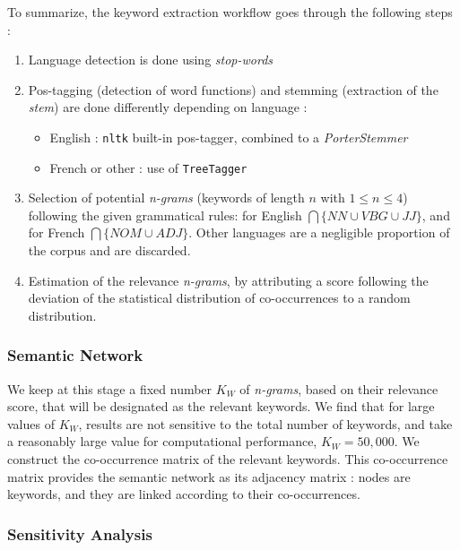 To summarize, the keyword extraction workflow goes through the following steps :

\begin{enumerate}
\item Language detection is done using \textit{stop-words}
\item Pos-tagging (detection of word functions) and stemming (extraction of the \emph{stem}) are done differently depending on language :
\begin{itemize}
\item English : \texttt{nltk} built-in pos-tagger, combined to a \emph{PorterStemmer}
\item French or other : use of \texttt{TreeTagger}~\citep{schmid1994probabilistic}
\end{itemize}
\item Selection of potential \textit{n-grams} (keywords of length $n$ with $1 \leq n \leq 4$) following the given grammatical rules: for English $\bigcap \{NN \cup VBG \cup JJ \}$, and for French $\bigcap \{NOM \cup ADJ\}$. Other languages are a negligible proportion of the corpus and are discarded.
\item Estimation of the relevance \textit{n-grams}, by attributing a score following the deviation of the statistical distribution of co-occurrences to a random distribution.
\end{enumerate}



\subsubsection*{Semantic Network}

We keep at this stage a fixed number $K_W$ of \textit{n-grams}, based on their relevance score, that will be designated as the relevant keywords. We find that for large values of $K_W$, results are not sensitive to the total number of keywords, and take a reasonably large value for computational performance, $K_W = 50,000$. We construct the co-occurrence matrix of the relevant keywords. This co-occurrence matrix provides the semantic network as its adjacency matrix : nodes are keywords, and they are linked according to their co-occurrences.



\subsubsection*{Sensitivity Analysis}

